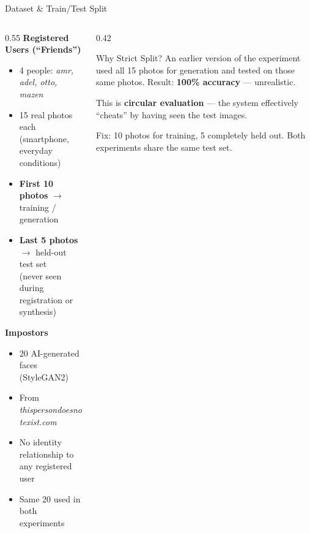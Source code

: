 \documentclass[aspectratio=169]{beamer}
\begin{document}
\begin{frame}{Dataset \& Train/Test Split}

\begin{columns}[T]
\begin{column}{0.55\textwidth}
    \textbf{Registered Users (``Friends'')}
    \begin{itemize}
        \item 4 people: \textit{amr, adel, otto, mazen}
        \item 15 real photos each (smartphone, everyday conditions)
        \item \textbf{First 10 photos} $\rightarrow$ training / generation
        \item \textbf{Last 5 photos} $\rightarrow$ held-out test set \\
              (never seen during registration or synthesis)
    \end{itemize}
    \vspace{6pt}
    \textbf{Impostors}
    \begin{itemize}
        \item 20 AI-generated faces (StyleGAN2)
        \item From \textit{thispersondoesnotexist.com}
        \item No identity relationship to any registered user
        \item Same 20 used in both experiments
    \end{itemize}
\end{column}
\begin{column}{0.42\textwidth}
    \begin{alertblock}{Why Strict Split?}
        \small
        An earlier version of the experiment used all 15 photos for generation and tested on those same photos. Result: \textbf{100\% accuracy} — unrealistic.

        \vspace{4pt}
        This is \textbf{circular evaluation} — the system effectively ``cheats'' by having seen the test images.

        \vspace{4pt}
        Fix: 10 photos for training, 5 completely held out. Both experiments share the same test set.
    \end{alertblock}
\end{column}
\end{columns}
\end{frame}
\end{document}
